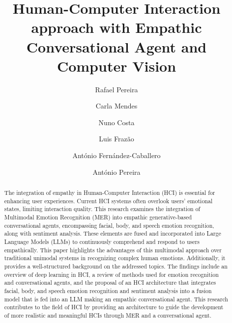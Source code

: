 \documentclass[runningheads]{llncs}
\begin{document}
%
\title{Human-Computer Interaction approach with Empathic Conversational Agent and Computer Vision}
%
%
\author{Rafael Pereira \and
Carla Mendes \and
Nuno Costa \and
Luis Frazão \and
António Fernández-Caballero \and
António Pereira}
%
%

%
\maketitle              %
%
\begin{abstract}

The integration of empathy in Human-Computer Interaction (HCI) is essential for enhancing user experiences. Current HCI systems often overlook users' emotional states, limiting interaction quality. This research examines the integration of Multimodal Emotion Recognition (MER) into empathic generative-based conversational agents, encompassing facial, body, and speech emotion recognition, along with sentiment analysis. These elements are fused and incorporated into Large Language Models (LLMs) to continuously comprehend and respond to users empathically. This paper highlights the advantages of this multimodal approach over traditional unimodal systems in recognizing complex human emotions. Additionally, it provides a well-structured background on the addressed topics. The findings include an overview of deep learning in HCI, a review of methods used for emotion recognition and conversational agents, and the proposal of an HCI architecture that integrates facial, body, and speech emotion recognition and sentiment analysis into a fusion model that is fed into an LLM making an empathic conversational agent. This research contributes to the field of HCI by providing an architecture to guide the development of more realistic and meaningful HCIs through MER and a conversational agent.

\end{abstract}
%
%
%
\end{document}
